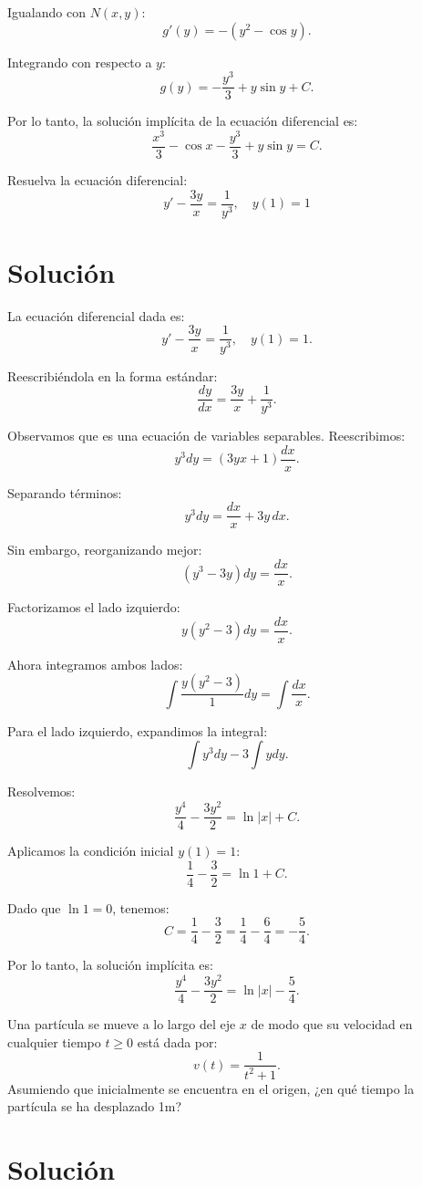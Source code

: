 \documentclass[12pt]{exam}
\begin{document}
\begin{questions}
Igualando con \(N(x, y)\):
\[
g'(y) = -(y^2 - \cos{y}).
\]

Integrando con respecto a \(y\):
\[
g(y) = -\frac{y^3}{3} + y\sin{y} + C.
\]

Por lo tanto, la solución implícita de la ecuación diferencial es:
\[
\frac{x^3}{3} - \cos{x} - \frac{y^3}{3} + y\sin{y} = C.
\]


\question Resuelva la ecuación diferencial:
\[
y' - \frac{3y}{x} = \frac{1}{y^3}, \quad y(1) = 1
\]
\section*{Solución}

La ecuación diferencial dada es:
\[
y' - \frac{3y}{x} = \frac{1}{y^3}, \quad y(1) = 1.
\]

Reescribiéndola en la forma estándar:
\[
\frac{dy}{dx} = \frac{3y}{x} + \frac{1}{y^3}.
\]

Observamos que es una ecuación de variables separables. Reescribimos:
\[
y^3 dy = \left( 3y x + 1 \right) \frac{dx}{x}.
\]

Separando términos:
\[
y^3 dy = \frac{dx}{x} + 3y \, dx.
\]

Sin embargo, reorganizando mejor:
\[
(y^3 - 3y) dy = \frac{dx}{x}.
\]

Factorizamos el lado izquierdo:
\[
y(y^2 - 3) dy = \frac{dx}{x}.
\]

Ahora integramos ambos lados:
\[
\int \frac{y(y^2 - 3)}{1} dy = \int \frac{dx}{x}.
\]

Para el lado izquierdo, expandimos la integral:
\[
\int y^3 dy - 3 \int y dy.
\]

Resolvemos:
\[
\frac{y^4}{4} - \frac{3y^2}{2} = \ln{|x|} + C.
\]

Aplicamos la condición inicial \( y(1) = 1 \):
\[
\frac{1}{4} - \frac{3}{2} = \ln{1} + C.
\]

Dado que \( \ln{1} = 0 \), tenemos:
\[
C = \frac{1}{4} - \frac{3}{2} = \frac{1}{4} - \frac{6}{4} = -\frac{5}{4}.
\]

Por lo tanto, la solución implícita es:
\[
\frac{y^4}{4} - \frac{3y^2}{2} = \ln{|x|} - \frac{5}{4}.
\]


\question Una partícula se mueve a lo largo del eje $x$ de modo que su velocidad en cualquier tiempo $t \geq 0$ está dada por:
\[
v(t) = \frac{1}{t^2 + 1}.
\]
Asumiendo que inicialmente se encuentra en el origen, ¿en qué tiempo la partícula se ha desplazado 1m?

\section*{Solución}


\end{questions}
\end{document}
